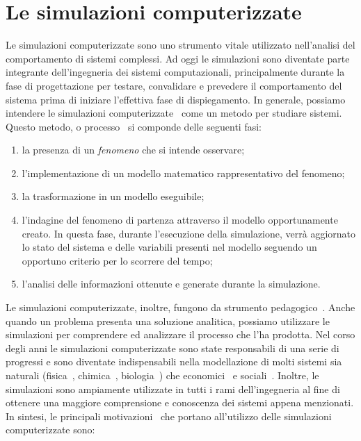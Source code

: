 \documentclass[12pt,a4paper,openright,oneside]{book}
\begin{document}
\section{Le simulazioni computerizzate}
Le simulazioni computerizzate sono uno strumento vitale utilizzato nell'analisi del comportamento di sistemi complessi.
Ad oggi le simulazioni sono diventate parte integrante dell'ingegneria dei sistemi computazionali, principalmente durante la fase di progettazione per testare, convalidare e prevedere il comportamento del sistema prima di iniziare l'effettiva fase di dispiegamento.
In generale, possiamo intendere le simulazioni computerizzate~\cite{sep-simulations-science} come un metodo per studiare sistemi. Questo metodo, o processo~\cite{comp-sim-ieee} si componde delle seguenti fasi:
\begin{enumerate}
    \item la presenza di un \textit{fenomeno} che si intende osservare;
    \item l'implementazione di un modello matematico rappresentativo del fenomeno;
    \item la trasformazione in un modello eseguibile;
    \item l'indagine del fenomeno di partenza attraverso il modello opportunamente creato. In questa fase, durante l'esecuzione della simulazione, verrà aggiornato lo stato del sistema e delle variabili presenti nel modello seguendo un opportuno criterio per lo scorrere del tempo;
    \item l'analisi delle informazioni ottenute e generate durante la simulazione.
\end{enumerate}
Le simulazioni computerizzate, inoltre, fungono da strumento pedagogico~\cite{comp-sim}. Anche quando un problema presenta una soluzione analitica, possiamo utilizzare le simulazioni per comprendere ed analizzare il processo che l'ha prodotta.
Nel corso degli anni le simulazioni computerizzate sono state responsabili di una serie di progressi e sono diventate indispensabili nella modellazione di molti sistemi sia naturali (fisica~\cite{comp-sim-phys}, chimica~\cite{comp-sim-chem}, biologia~\cite{comp-sim-biol}) che economici~\cite{comp-sim-econ} e sociali~\cite{comp-sim-soc}. 
Inoltre, le simulazioni sono ampiamente utilizzate in tutti i rami dell'ingegneria al fine di ottenere una maggiore comprensione e conoscenza dei sistemi appena menzionati.
In sintesi, le principali motivazioni~\cite{Zeigler:2000} che portano all'utilizzo delle simulazioni computerizzate sono:
\end{document}
